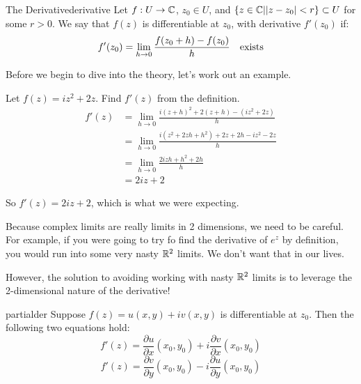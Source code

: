 \begin{defbo}{The Derivative}{derivative}
Let $f:U\rightarrow \mathbb{C}$, $z_0\in U$, and $\{z\in\mathbb{C}| |z-z_0|< r\}\subset U$ for some $r > 0$. We say that $f(z)$ is differentiable at $z_0$, with derivative $f'(z_0)$ if:
$$f'(z_0) = \lim_{h\rightarrow 0} \frac{f(z_0 + h) - f(z_0)}{h} \text{\quad exists}$$
\end{defbo}

Before we begin to dive into the theory, let's work out an example.

\begin{ex}{}{} Let $f(z) = iz^2 + 2z$. Find $f'(z)$ from the definition.
\begin{align*}f'(z) &= \lim_{h\rightarrow 0} \frac{i(z+h)^2 + 2(z+h) - (iz^2 + 2z)}{h}\\
&= \lim_{h\rightarrow 0}\frac{i(z^2 + 2zh + h^2) + 2z + 2h - iz^2 - 2z}{h}\\
&= \lim_{h\rightarrow 0} \frac{2izh + h^2 + 2h}{h}\\
&= 2iz + 2
\end{align*}

So $f'(z) = 2iz + 2$, which is what we were expecting.
\end{ex}

Because complex limits are really limits in 2 dimensions, we need to be careful. For example, if you were going to try fo find the derivative of $e^z$ by definition, you would run into some very nasty $\mathbb{R}^2$ limits. We don't want that in our lives. 

However, the solution to avoiding working with nasty $\mathbb{R}^2$ limits is to leverage the 2-dimensional nature of the derivative!

\begin{thmbo}{}{partialder} Suppose $f(z) = u(x,y) + iv(x,y)$ is differentiable at $z_0$. Then the following two equations hold:
$$f'(z) = \frac{\partial u}{\partial x}(x_0,y_0) + i\frac{\partial v}{\partial x}(x_0,y_0)$$
$$f'(z) = \frac{\partial v}{\partial y}(x_0,y_0) - i\frac{\partial u}{\partial y}(x_0,y_0)$$
\end{thmbo}

